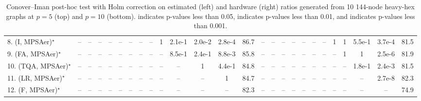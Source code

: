 \begin{table}[ht]
{\begin{tabular}{l|ccccccccccccc|cccccccccccc|}
8. (I, MPSAer)$^\star$ & -- & -- & -- & -- & -- & -- & -- & -- & 1 & 2.1e-1 & {\cellcolor[HTML]{B5E1AE}} \color[HTML]{000000} 2.0e-2 & {\cellcolor[HTML]{00441B}} \color[HTML]{F1F1F1} 2.8e-4 & 86.7 & -- & -- & -- & -- & -- & -- & -- & 1 & 1 & 5.5e-1 & {\cellcolor[HTML]{00441B}} \color[HTML]{F1F1F1} 3.7e-4 & 81.5 \\
9. (FA, MPSAer)$^\star$ & -- & -- & -- & -- & -- & -- & -- & -- & -- & 8.5e-1 & 2.4e-1 & {\cellcolor[HTML]{309950}} \color[HTML]{F1F1F1} 8.8e-3 & 85.8 & -- & -- & -- & -- & -- & -- & -- & -- & 1 & 1 & {\cellcolor[HTML]{00441B}} \color[HTML]{F1F1F1} 2.5e-6 & 81.9 \\
10. (TQA, MPSAer)$^\star$ & -- & -- & -- & -- & -- & -- & -- & -- & -- & -- & 1 & 4.4e-1 & 84.8 & -- & -- & -- & -- & -- & -- & -- & -- & -- & 1.8e-1 & {\cellcolor[HTML]{309950}} \color[HTML]{F1F1F1} 2.4e-3 & 81.5 \\
11. (LR, MPSAer)$^\star$ & -- & -- & -- & -- & -- & -- & -- & -- & -- & -- & -- & 1 & 84.7 & -- & -- & -- & -- & -- & -- & -- & -- & -- & -- & {\cellcolor[HTML]{00441B}} \color[HTML]{F1F1F1} 2.7e-8 & 82.3 \\
12. (F, MPSAer)$^\star$ & -- & -- & -- & -- & -- & -- & -- & -- & -- & -- & -- & -- & 82.3 & -- & -- & -- & -- & -- & -- & -- & -- & -- & -- & -- & 74.9 \\
\hline

\end{tabular}
}
\caption{Conover–Iman post-hoc test with Holm correction on estimated (left) and hardware (right) ratios generated from 10 144-node heavy-hex graphs at $p=5$ (top) and $p=10$ (bottom).  indicates p-values less than 0.05,  indicates p-values less than 0.01, and  indicates p-values less than 0.001.}
\label{tab:N144HH73_5_10_100pc_hw}
\end{table}